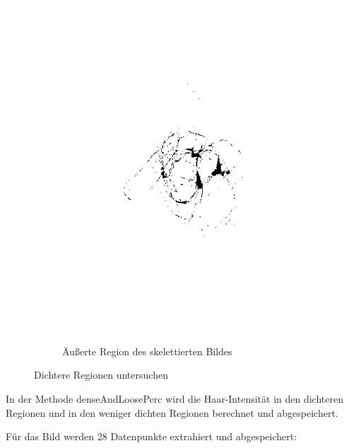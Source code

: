 \documentclass[german,a4paper,12pt,smallheadings,headsepline, titlepage, liststotoc, idextotoc,bibtoctoc,blibliography = totocnumbered]{scrartcl}
\begin{document}
\begin{figure}
\begin{subfigure}[b]{0.475\textwidth}
		\includegraphics[width=\textwidth]{fig64/09outer section.png}
		\caption[]{Äußerte Region des skelettierten Bildes}
		\label{img:skel}
	\end{subfigure}
	\caption[  ]
	{\small Dichtere Regionen untersuchen} 
	\label{img:tstM}
\end{figure}

In der Methode denseAndLoosePerc wird die Haar-Intensität in den dichteren Regionen und in den weniger dichten Regionen berechnet und abgespeichert.

Für das Bild werden 28 Datenpunkte extrahiert und abgespeichert: 
\end{document}
